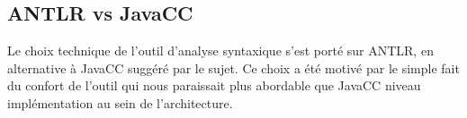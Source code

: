 \subsection{ANTLR vs JavaCC}

Le choix technique de l'outil d'analyse syntaxique s'est porté sur ANTLR, en alternative à JavaCC suggéré par le sujet. Ce choix a été motivé par le simple fait du confort de l'outil qui nous paraissait plus abordable que JavaCC niveau implémentation au sein de l'architecture.